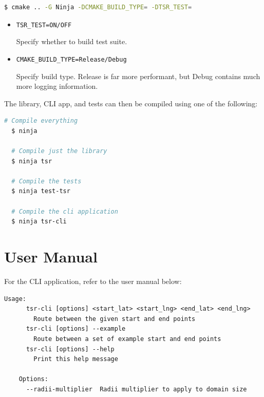 \documentclass[12pt]{article}
\begin{document}
\begin{appendices}
  \begin{lstlisting}[language=bash]
  $ cmake .. -G Ninja -DCMAKE_BUILD_TYPE= -DTSR_TEST=
\end{lstlisting}

  \vspace*{-2em}

  \begin{itemize}
    \item \texttt{TSR\_TEST=ON/OFF}

          Specify whether to build test suite.

    \item \texttt{CMAKE\_BUILD\_TYPE=Release/Debug}

          Specify build type. Release is far more performant, but Debug contains much more logging information.
  \end{itemize}


  \noindent The library, CLI app, and tests can then be compiled using one of the following:

  \begin{lstlisting}[language=bash]
  # Compile everything
  $ ninja

  # Compile just the library
  $ ninja tsr

  # Compile the tests
  $ ninja test-tsr

  # Compile the cli application
  $ ninja tsr-cli
\end{lstlisting}

  \pagebreak
  \section{User Manual}

  For the CLI application, refer to the user manual below:

  \begin{lstlisting}[]
  Usage: 
      tsr-cli [options] <start_lat> <start_lng> <end_lat> <end_lng>
        Route between the given start and end points
      tsr-cli [options] --example  
        Route between a set of example start and end points
      tsr-cli [options] --help
        Print this help message

    Options:
      --radii-multiplier  Radii multiplier to apply to domain size
\end{lstlisting}

  \pagebreak
  
  

\end{appendices}
\end{document}
